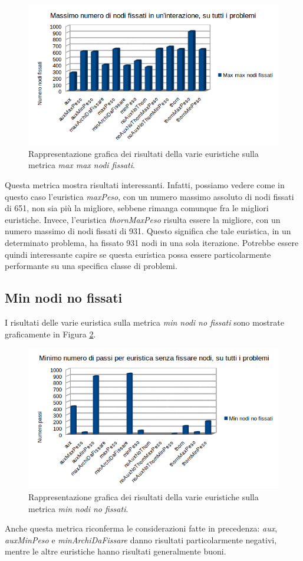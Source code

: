\begin{figure}[H]
\includegraphics[width=\textwidth]{res/img/maxMaxNodiFissati.png}
\caption{Rappresentazione grafica dei risultati della varie euristiche sulla metrica \textit{max max nodi fissati}.}
\label{fig:maxMaxNodiFissati}
\end{figure}

Questa metrica mostra risultati interessanti. Infatti, possiamo vedere come in questo caso l'euristica \textit{maxPeso}, con un numero massimo assoluto di nodi fissati di 651, non sia più la migliore, sebbene rimanga comunque fra le migliori euristiche. Invece, l'euristica \textit{thornMaxPeso} risulta essere la migliore, con un numero massimo di nodi fissati di 931. Questo significa che tale euristica, in un determinato problema, ha fissato 931 nodi in una sola iterazione. Potrebbe essere quindi interessante capire se questa euristica possa essere particolarmente performante su una specifica classe di problemi.

\subsection{Min nodi no fissati}
I risultati delle varie euristica sulla metrica \textit{min nodi no fissati} sono mostrate graficamente in Figura \ref{fig:minNodiNoFissati}.

\begin{figure}[H]
\includegraphics[width=\textwidth]{res/img/minNodiNoFissati.png}
\caption{Rappresentazione grafica dei risultati della varie euristiche sulla metrica \textit{min nodi no fissati}.}
\label{fig:minNodiNoFissati}
\end{figure}

Anche questa metrica riconferma le considerazioni fatte in precedenza: \textit{aux}, \textit{auxMinPeso} e \textit{minArchiDaFissare} danno risultati particolarmente negativi, mentre le altre euristiche hanno risultati generalmente buoni. 